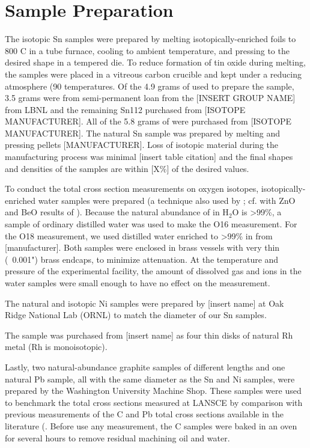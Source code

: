 \section{Sample Preparation}

The isotopic Sn samples were prepared by melting isotopically-enriched foils to
800 C in a tube furnace, cooling to ambient temperature, and pressing to the
desired shape in a tempered die. To reduce formation of tin
oxide during melting, the samples were placed in a vitreous carbon crucible
and kept under a reducing atmosphere (90%
temperatures. Of the 4.9 grams of \snTwelve used to prepare the sample,
3.5 grams were from
semi-permanent loan from the [INSERT GROUP NAME] from LBNL and the remaining
Sn112 purchased from [ISOTOPE MANUFACTURER]. All of the 5.8 grams of \snFour were purchased from
[ISOTOPE MANUFACTURER]. The natural Sn sample was prepared by melting and
pressing pellets [MANUFACTURER]. Loss of isotopic material during the
manufacturing process was minimal [insert table citation] and the final 
shapes and densities of the samples are within [X\%] of the desired values.

To conduct the total cross section measurements on oxygen isotopes,
isotopically-enriched water samples were prepared (a technique also used by
\cite{Vaughn1965, Salisbury1965}; cf.  with ZnO and BeO results of \cite{Finlay1993}).
Because the natural abundance of \oSix in H$_{2}$O is >99\%, a sample of
ordinary distilled water was used to make the O16 measurement. For the O18
measurement, we used distilled water enriched to >99\% in \oEight from
[manufacturer]. Both samples were enclosed in brass vessels with very thin
(~0.001") brass endcaps, to minimize attenuation. At the temperature and
pressure of the experimental facility, the amount of dissolved gas and ions
in the water samples were small enough to have no effect on the measurement.

The natural and isotopic Ni samples were prepared by [insert name] at Oak Ridge National Lab 
(ORNL) to match the diameter of our Sn samples.

The \rhThree sample was purchased from [insert name] as four thin disks of natural Rh metal (Rh is
monoisotopic).

Lastly, two natural-abundance graphite samples of different lengths and one
natural Pb sample, all with the same diameter as the Sn and Ni samples, were
prepared by the Washington University Machine Shop. These
samples were used to benchmark the total cross sections measured at LANSCE by
comparison with previous measurements of the C and Pb total cross sections
available in the literature (\cite{Finlay1993,Abfalterer2001}. Before use any
measurement, the C samples were baked in an oven for several
hours to remove residual machining oil and water.

